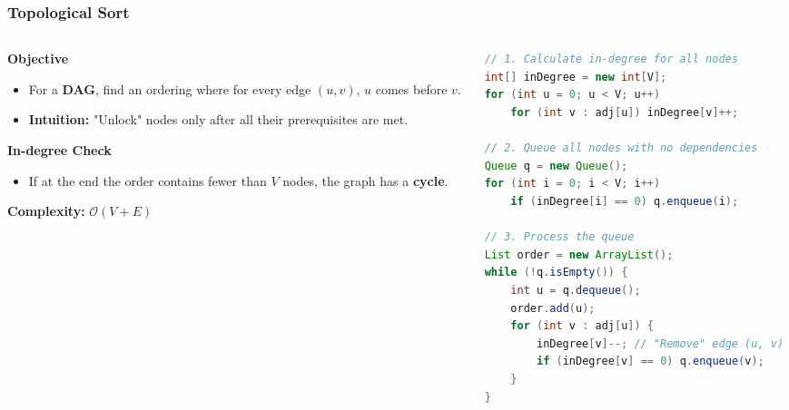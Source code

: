\documentclass[8pt,aspectratio=169]{beamer}
\begin{document}
\begin{frame}[t, fragile]
\frametitle{Topological Sort}

\begin{columns}[T]
    \begin{column}{0.45\textwidth}
        \textbf{Objective}
        \begin{itemize}
            \item For a \textbf{DAG}, find an ordering where for every edge $(u, v)$, $u$ comes before $v$.
            \item \textbf{Intuition:} "Unlock" nodes only after all their prerequisites are met.
        \end{itemize}
        \vspace{0.3cm}
        \textbf{In-degree Check}
        \begin{itemize}
            \item If at the end the order contains fewer than $V$ nodes, the graph has a \textbf{cycle}.
        \end{itemize}
        \textbf{Complexity:} $\mathcal{O}(V+E)$
    \end{column}

    \begin{column}{0.55\textwidth}
\begin{lstlisting}[language=Java, basicstyle=\tiny\ttfamily, keywordstyle=\color{blue}, frame=single]
// 1. Calculate in-degree for all nodes
int[] inDegree = new int[V];
for (int u = 0; u < V; u++)
    for (int v : adj[u]) inDegree[v]++;

// 2. Queue all nodes with no dependencies
Queue q = new Queue();
for (int i = 0; i < V; i++)
    if (inDegree[i] == 0) q.enqueue(i);

// 3. Process the queue
List order = new ArrayList();
while (!q.isEmpty()) {
    int u = q.dequeue();
    order.add(u);
    for (int v : adj[u]) {
        inDegree[v]--; // "Remove" edge (u, v)
        if (inDegree[v] == 0) q.enqueue(v);
    }
}
\end{lstlisting}
    \end{column}
\end{columns}
\end{frame}
\end{document}
